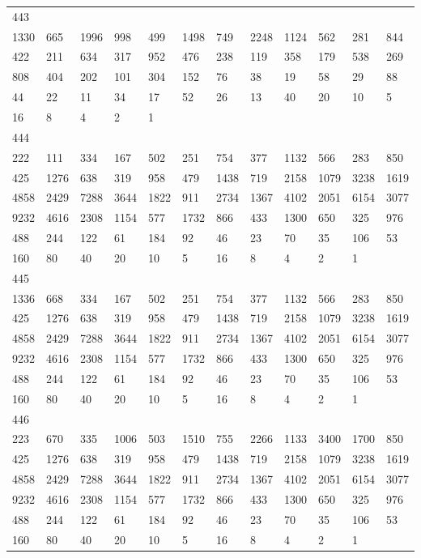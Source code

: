 \begin{longtable}{llllllllllll}
443&&&&&&&&&&&\\
1330& 665& 1996& 998& 499& 1498& 749& 2248& 1124& 562& 281& 844\\
422& 211& 634& 317& 952& 476& 238& 119& 358& 179& 538& 269\\
808& 404& 202& 101& 304& 152& 76& 38& 19& 58& 29& 88\\
44& 22& 11& 34& 17& 52& 26& 13& 40& 20& 10& 5\\
16& 8& 4& 2& 1& \\

444&&&&&&&&&&&\\
222& 111& 334& 167& 502& 251& 754& 377& 1132& 566& 283& 850\\
425& 1276& 638& 319& 958& 479& 1438& 719& 2158& 1079& 3238& 1619\\
4858& 2429& 7288& 3644& 1822& 911& 2734& 1367& 4102& 2051& 6154& 3077\\
9232& 4616& 2308& 1154& 577& 1732& 866& 433& 1300& 650& 325& 976\\
488& 244& 122& 61& 184& 92& 46& 23& 70& 35& 106& 53\\
160& 80& 40& 20& 10& 5& 16& 8& 4& 2& 1& \\

445&&&&&&&&&&&\\
1336& 668& 334& 167& 502& 251& 754& 377& 1132& 566& 283& 850\\
425& 1276& 638& 319& 958& 479& 1438& 719& 2158& 1079& 3238& 1619\\
4858& 2429& 7288& 3644& 1822& 911& 2734& 1367& 4102& 2051& 6154& 3077\\
9232& 4616& 2308& 1154& 577& 1732& 866& 433& 1300& 650& 325& 976\\
488& 244& 122& 61& 184& 92& 46& 23& 70& 35& 106& 53\\
160& 80& 40& 20& 10& 5& 16& 8& 4& 2& 1& \\

446&&&&&&&&&&&\\
223& 670& 335& 1006& 503& 1510& 755& 2266& 1133& 3400& 1700& 850\\
425& 1276& 638& 319& 958& 479& 1438& 719& 2158& 1079& 3238& 1619\\
4858& 2429& 7288& 3644& 1822& 911& 2734& 1367& 4102& 2051& 6154& 3077\\
9232& 4616& 2308& 1154& 577& 1732& 866& 433& 1300& 650& 325& 976\\
488& 244& 122& 61& 184& 92& 46& 23& 70& 35& 106& 53\\
160& 80& 40& 20& 10& 5& 16& 8& 4& 2& 1& \\


\end{longtable}
